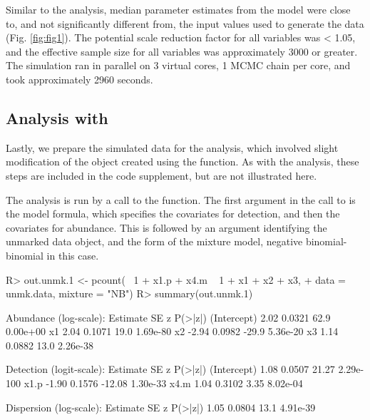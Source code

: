 \documentclass[codesnippet]{jss}
\begin{document}
Similar to the  analysis, median parameter estimates from the  model were close to, and not significantly different from, the input values used to generate the data (Fig. \ref{fig:fig1}). The potential scale reduction factor for all variables was < 1.05, and the effective sample size for all variables was approximately 3000 or greater. The simulation ran in parallel on 3 virtual cores, 1 MCMC chain per core, and took approximately 2960 seconds.

\subsection[Analysis with unmarked]{Analysis with }
Lastly, we prepare the simulated data for the  analysis, which involved slight modification of the  object created using the  function. As with the  analysis, these steps are included in the code supplement, but are not illustrated here.

The  analysis is run by a call to the  function. The first argument in the call to  is the model formula, which specifies the covariates for detection, and then the covariates for abundance. This is followed by an argument identifying the unmarked data object, and the form of the mixture model, negative binomial-binomial in this case.

\begin{CodeInput}
R> out.unmk.1 <- pcount(~ 1 + x1.p + x4.m ~ 1 + x1 + x2 + x3,
+    data = unmk.data, mixture = "NB")
R> summary(out.unmk.1)
\end{CodeInput}

\begin{CodeOutput}
Abundance (log-scale):
            Estimate       SE       z     P(>|z|)
(Intercept)     2.02   0.0321    62.9    0.00e+00
x1              2.04   0.1071    19.0    1.69e-80
x2             -2.94   0.0982   -29.9    5.36e-20
x3              1.14   0.0882    13.0    2.26e-38

Detection (logit-scale):
            Estimate       SE       z     P(>|z|)
(Intercept)     1.08   0.0507   21.27   2.29e-100
x1.p           -1.90   0.1576  -12.08    1.30e-33
x4.m            1.04   0.3102    3.35    8.02e-04

Dispersion (log-scale):
Estimate          SE     z    P(>|z|)
1.05          0.0804  13.1   4.91e-39
\end{CodeOutput}
\end{document}
